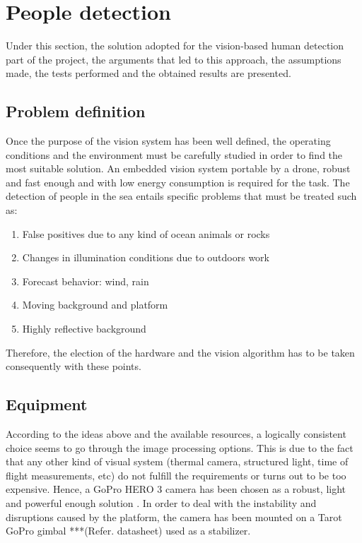\chapter{People detection}
Under this section, the solution adopted for the vision-based human detection part of the project, the arguments that led to this approach, the assumptions made, the tests performed and the obtained results are presented. 

\section{Problem definition}
Once the purpose of the vision system has been well defined, the operating conditions and the environment must be carefully studied in order to find the most suitable solution.
An embedded vision system portable by a drone, robust and fast enough and with low energy consumption is required for the task. 
The detection of people in the sea entails specific problems that must be treated such as:

\begin{enumerate}[itemsep=1mm,topsep=1mm,leftmargin=.35in]
    \item False positives due to any kind of ocean animals or rocks
    \item Changes in illumination conditions due to outdoors work
    \item Forecast behavior: wind, rain
    \item Moving background and platform
    \item Highly reflective background
\end{enumerate}%

Therefore, the election of the hardware and the vision algorithm has to be taken consequently with these points.

\section{Equipment}
According to the ideas above and the available resources, a logically consistent choice seems to go through the image processing options. 
This is due to the fact that any other kind of visual system (thermal camera, structured light, time of flight measurements, etc) do not fulfill the requirements or turns out to be too expensive.
Hence, a GoPro HERO 3 camera has been chosen as a robust, light and powerful enough solution \cite{ref:HERO3}.
In order to deal with the instability and disruptions caused by the platform, the camera has been mounted on a Tarot GoPro gimbal ***(Refer. datasheet) used as a stabilizer.

